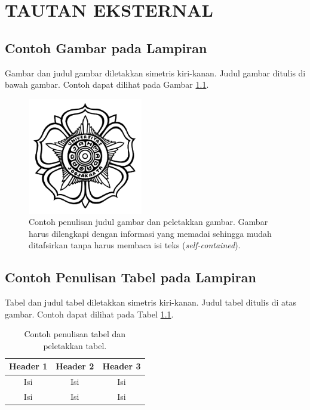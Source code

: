 \chapter{TAUTAN EKSTERNAL}



\section{Contoh Gambar pada Lampiran}
Gambar dan judul gambar diletakkan simetris kiri-kanan. Judul gambar ditulis di bawah
gambar. Contoh dapat dilihat pada Gambar \ref{fig:a}.

\begin{figure}[!h]
    \centering
    \includegraphics[width=5cm]{logoUGM.jpg}
    \caption{Contoh penulisan judul gambar dan peletakkan gambar. Gambar harus dilengkapi
dengan informasi yang memadai sehingga mudah ditafsirkan tanpa harus membaca
isi teks (\textit{self-contained}).}
    \label{fig:a}
\end{figure}

\section{Contoh Penulisan Tabel pada Lampiran}
Tabel dan judul tabel diletakkan simetris kiri-kanan. Judul tabel ditulis di atas gambar.
Contoh dapat dilihat pada Tabel \ref{tbl:b}.

\begin{table}[!h]
    \caption{Contoh penulisan tabel dan peletakkan tabel.}
    \label{tbl:b}
    \centering
\begin{tabular}{|c|c|c|}
\hline
Header 1 & Header 2 & Header 3 \\ 
\hline
Isi & Isi & Isi \\ 
\hline
Isi & Isi & Isi \\
\hline
\end{tabular}
\end{table}

